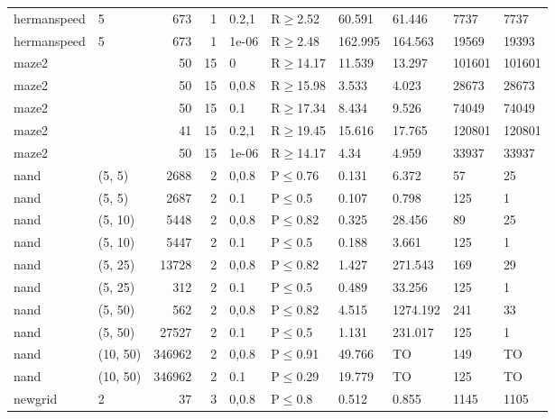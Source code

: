 \begin{longtable}{llrrllllll}
 hermanspeed   & 5        &    	673 &   1 & 0.2,1 & R$\geq$2.52  & 60.591  & 61.446   & 7737   & 7737   \\
 hermanspeed   & 5        &    	673 &   1 & 1e-06 & R$\geq$2.48  & 162.995 & 164.563  & 19569  & 19393  \\
 maze2         &          &     	50 &  15 & 0     & R$\geq$14.17 & 11.539  & 13.297   & 101601 & 101601 \\
 maze2         &          &     	50 &  15 & 0,0.8 & R$\geq$15.98 & 3.533   & 4.023    & 28673  & 28673  \\
 maze2         &          &     	50 &  15 & 0.1   & R$\geq$17.34 & 8.434   & 9.526    & 74049  & 74049  \\
 maze2         &          &     	41 &  15 & 0.2,1 & R$\geq$19.45 & 15.616  & 17.765   & 120801 & 120801 \\
 maze2         &          &     	50 &  15 & 1e-06 & R$\geq$14.17 & 4.34    & 4.959    & 33937  & 33937  \\
 nand          & (5, 5)   &   	2688 &   2 & 0,0.8 & P$\leq$0.76  & 0.131   & 6.372    & 57     & 25     \\
 nand          & (5, 5)   &   	2687 &   2 & 0.1   & P$\leq$0.5   & 0.107   & 0.798    & 125    & 1      \\
 nand          & (5, 10)  &   	5448 &   2 & 0,0.8 & P$\leq$0.82  & 0.325   & 28.456   & 89     & 25     \\
 nand          & (5, 10)  &   	5447 &   2 & 0.1   & P$\leq$0.5   & 0.188   & 3.661    & 125    & 1      \\
 nand          & (5, 25)  &  	13728 &   2 & 0,0.8 & P$\leq$0.82  & 1.427   & 271.543  & 169    & 29     \\
 nand          & (5, 25)  &    	312 &   2 & 0.1   & P$\leq$0.5   & 0.489   & 33.256   & 125    & 1      \\
 nand          & (5, 50)  &    	562 &   2 & 0,0.8 & P$\leq$0.82  & 4.515   & 1274.192 & 241    & 33     \\
 nand          & (5, 50)  &  	27527 &   2 & 0.1   & P$\leq$0.5   & 1.131   & 231.017  & 125    & 1      \\
 nand          & (10, 50) & 	346962 &   2 & 0,0.8 & P$\leq$0.91  & 49.766  & TO       & 149    & TO     \\
 nand          & (10, 50) & 	346962 &   2 & 0.1   & P$\leq$0.29  & 19.779  & TO       & 125    & TO     \\
 newgrid       & 2        &     	37 &   3 & 0,0.8 & P$\leq$0.8   & 0.512   & 0.855    & 1145   & 1105   \\

\end{longtable}
